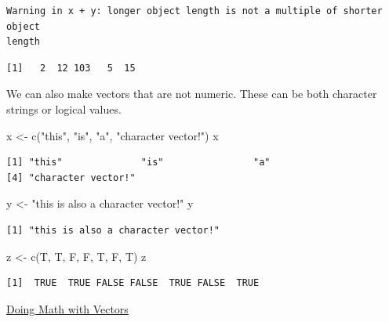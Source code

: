 \documentclass[
  letterpaper,
  DIV=11,
  numbers=noendperiod]{scrreprt}
\newenvironment{Shaded}{\begin{snugshade}}{\end{snugshade}}
\newcommand{\FunctionTok}[1]{\textcolor[rgb]{0.28,0.35,0.67}{#1}}
\newcommand{\NormalTok}[1]{\textcolor[rgb]{0.00,0.23,0.31}{#1}}
\newcommand{\OtherTok}[1]{\textcolor[rgb]{0.00,0.23,0.31}{#1}}
\newcommand{\StringTok}[1]{\textcolor[rgb]{0.13,0.47,0.30}{#1}}
\begin{document}
\begin{verbatim}
Warning in x + y: longer object length is not a multiple of shorter object
length
\end{verbatim}

\begin{verbatim}
[1]   2  12 103   5  15
\end{verbatim}

We can also make vectors that are not numeric. These can be both
character strings or logical values.

\begin{Shaded}
\begin{Highlighting}[]
\NormalTok{x }\OtherTok{\textless{}{-}} \FunctionTok{c}\NormalTok{(}\StringTok{"this"}\NormalTok{, }\StringTok{"is"}\NormalTok{, }\StringTok{"a"}\NormalTok{, }\StringTok{"character vector!"}\NormalTok{)}
\NormalTok{x}
\end{Highlighting}
\end{Shaded}

\begin{verbatim}
[1] "this"              "is"                "a"                
[4] "character vector!"
\end{verbatim}

\begin{Shaded}
\begin{Highlighting}[]
\NormalTok{y }\OtherTok{\textless{}{-}} \StringTok{"this is also a character vector!"}
\NormalTok{y}
\end{Highlighting}
\end{Shaded}

\begin{verbatim}
[1] "this is also a character vector!"
\end{verbatim}

\begin{Shaded}
\begin{Highlighting}[]
\NormalTok{z }\OtherTok{\textless{}{-}} \FunctionTok{c}\NormalTok{(T, T, F, F, T, F, T)}
\NormalTok{z}
\end{Highlighting}
\end{Shaded}

\begin{verbatim}
[1]  TRUE  TRUE FALSE FALSE  TRUE FALSE  TRUE
\end{verbatim}

\begin{watch}{}{}
    \href{https://youtu.be/L58Xl50txa0}{Doing Math with Vectors}
\end{watch}
\end{document}
